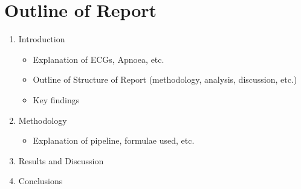 \chapter{Outline of Report}\label{Outline}
\begin{enumerate}
	\item Introduction
	\begin{itemize}
		\item Explanation of ECGs, Apnoea, etc.
		\item Outline of Structure of Report (methodology, analysis, discussion, etc.)
		\item Key findings
	\end{itemize}
	\item Methodology
	\begin{itemize}
		\item Explanation of pipeline, formulae used, etc.
	\end{itemize}
	\item Results and Discussion
	\item Conclusions
\end{enumerate}